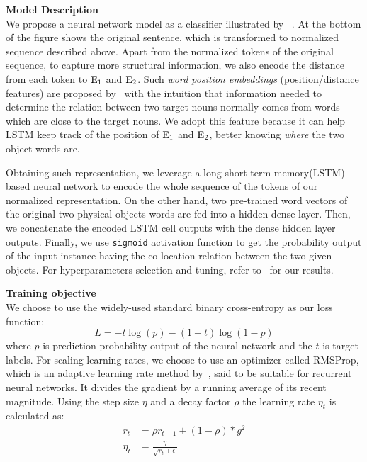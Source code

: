 \noindent \textbf{Model Description}
\\
We propose a neural network model as a classifier illustrated by ~.
At the bottom of the figure shows the original sentence, which is transformed to normalized sequence described above.
Apart from the normalized tokens of the original sequence, to capture more structural information, we also encode the distance from each token to $\textnormal E_1$ and $\textnormal E_2$.
Such \textit{word position embeddings} (position/distance features) are proposed by~\citeauthor{zeng2014relation} with the intuition that information needed to determine the relation between two target nouns normally comes from words which are close to the target nouns. We adopt this feature because it can help LSTM keep track of the position of $\textnormal E_1$ and $\textnormal E_2$, better knowing \textit{where} the two object words are.

Obtaining such representation, we leverage a long-short-term-memory(LSTM) based neural network to encode the whole sequence of the tokens of our normalized representation. On the other hand, two pre-trained word vectors of the original two physical objects words are fed into a hidden dense layer. 
Then, we concatenate the encoded LSTM cell outputs with the dense hidden layer outputs.
Finally, we use \texttt{sigmoid} activation function to get the 
probability output of the input instance having the co-location relation 
between the two given objects. For hyperparameters selection and tuning, refer to~ for our results.

\noindent \textbf{Training objective}\\
We choose to use the widely-used standard binary cross-entropy as our loss function:
\begin{equation*}
	L = -t \log(p) - (1 - t) \log(1 - p)
\end{equation*}
where $p$ is prediction probability output of the neural network and the $t$ is target labels.
For scaling learning rates, we choose to use an optimizer called RMSProp, which is an adaptive learning rate method by~\citeauthor{hinton2012neural}, said to be suitable for recurrent neural networks. It divides the	gradient	by	a	running	average	of	its	recent	magnitude. Using the step size $\eta$ and a decay factor $\rho$ the learning rate $\eta_t$ is calculated as:
\begin{equation*}
	\begin{split}r_t &= \rho r_{t-1} + (1-\rho)*g^2\\
	\eta_t &= \frac{\eta}{\sqrt{r_t + \epsilon}}\end{split}
\end{equation*}


